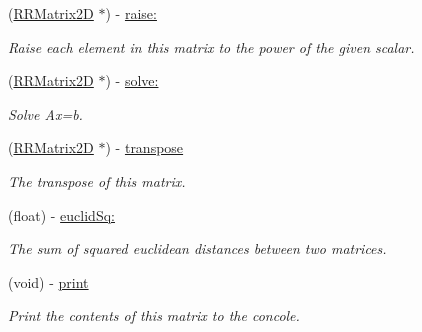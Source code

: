 \begin{DoxyCompactItemize}
(\hyperlink{interface_r_r_matrix2_d}{R\-R\-Matrix2\-D} $\ast$) -\/ \hyperlink{interface_r_r_matrix2_d_ae83a92e76b0ab058bebc986ca0bad1c3}{raise\-:}
\begin{DoxyCompactList}\small\item\em Raise each element in this matrix to the power of the given scalar. \end{DoxyCompactList}\item 
(\hyperlink{interface_r_r_matrix2_d}{R\-R\-Matrix2\-D} $\ast$) -\/ \hyperlink{interface_r_r_matrix2_d_a765cfd394402dfaf90a43abebc4ac3b5}{solve\-:}
\begin{DoxyCompactList}\small\item\em Solve {\ttfamily Ax=b}. \end{DoxyCompactList}\item 
(\hyperlink{interface_r_r_matrix2_d}{R\-R\-Matrix2\-D} $\ast$) -\/ \hyperlink{interface_r_r_matrix2_d_a563fcc498bfcdc04288e19804e5b17b8}{transpose}
\begin{DoxyCompactList}\small\item\em The transpose of this matrix. \end{DoxyCompactList}\item 
(float) -\/ \hyperlink{interface_r_r_matrix2_d_a2166f8146ff0d7124370fa883b71db5a}{euclid\-Sq\-:}
\begin{DoxyCompactList}\small\item\em The sum of squared euclidean distances between two matrices. \end{DoxyCompactList}\item 
\hypertarget{interface_r_r_matrix2_d_ad3ab5b438b3cac957037a1251deae212}{(void) -\/ \hyperlink{interface_r_r_matrix2_d_ad3ab5b438b3cac957037a1251deae212}{print}}\label{interface_r_r_matrix2_d_ad3ab5b438b3cac957037a1251deae212}

\begin{DoxyCompactList}\small\item\em Print the contents of this matrix to the concole. \end{DoxyCompactList}\end{DoxyCompactItemize}
